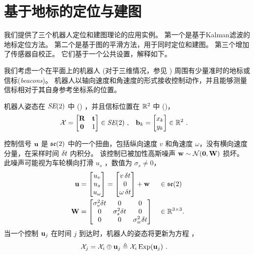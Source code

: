 
\newcommand{\dx}{{\delta\bfx}}

\section{基于地标的定位与建图}
\label{sec:SLAM}

我们提供了三个机器人定位和建图理论的应用实例。 
第一个是基于Kalman滤波的地标定位方法。
第二个是基于图的平滑方法，用于同时定位和建图。
第三个增加了传感器自校正。
它们基于一个公共设置，解释如下。

我们考虑一个在平面上的机器人
(对于三维情况，参见 )
周围有少量准时的地标或信标(\emph{beacons})。 
机器人以轴向速度和角速度的形式接收控制动作，并且能够测量信标相对于其自身参考坐标系的位置。


机器人姿态在 $\textit{SE}(2)$ 中 () ，并且信标位置在 ${\mathbb R}^2$ 中 ()，
%
\begin{align*}
\mathcal{X} &= 
\begin{bmatrix}
{\bf R} & {\bf t} \\ \bf0 & 1
\end{bmatrix}\in\textit{SE}(2)
~,
&
{\bf b}_k &= \begin{bmatrix}
x_k \\ y_k
\end{bmatrix}\in{\mathbb R}^2
~.
\end{align*}

控制信号 ${\bf u}$ 是 ${\mathfrak {se}}(2)$ 中的一个扭曲，包括纵向速度 $v$ 和角速度 $\omega$，没有横向速度分量，在采样时间 $\delta t$ 内积分。
该控制已被加性高斯噪声 ${\bf w}\sim\mathcal{N}(\bf0,{\bf W})$ 损坏。
此噪声可能视为车轮横向打滑 $u_s$ ，数值为 $\sigma_s\ne0$，
%
\begin{align}
{\bf u} &
= \begin{bmatrix}  u_v \\  u_s \\  u_\omega \end{bmatrix} 
= \begin{bmatrix} v\,\delta t \\ 0 \\ \omega\,\delta t \end{bmatrix}+{\bf w}  
&&\in{\mathfrak {se}}(2)
\\
{\bf W} &= \begin{bmatrix}
\sigma_v^2\delta t &0&0 \\ 0&\sigma_s^2\delta t&0 \\ 0&0&\sigma_w^2\delta t
\end{bmatrix} &&\in{\mathbb R}^{3\times3}.
\end{align}
%
当一个控制 ${\bf u}_j$ 在时间 $j$ 到达时，机器人的姿态将更新为方程 ，
%
\begin{align}\label{equ:motion}
\mathcal{X}_j &= \mathcal{X}_i \oplus {\bf u}_j \triangleq \mathcal{X}_i  \operatorname*{Exp}({\bf u}_j)
~.
\end{align}



